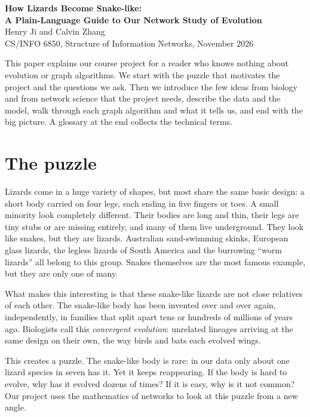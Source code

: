 \documentclass[11pt]{article}
\begin{document}
\begin{center}
{\Large\bfseries How Lizards Become Snake-like:\\[2pt] A Plain-Language Guide to Our Network Study of Evolution}\\[8pt]
Henry Ji and Calvin Zhang\\
CS/INFO 6850, Structure of Information Networks, November 2026
\end{center}

\vspace{6pt}
\noindent This paper explains our course project for a reader who knows nothing about evolution or graph algorithms. We start with the puzzle that motivates the project and the questions we ask. Then we introduce the few ideas from biology and from network science that the project needs, describe the data and the model, walk through each graph algorithm and what it tells us, and end with the big picture. A glossary at the end collects the technical terms.

\section{The puzzle}

Lizards come in a huge variety of shapes, but most share the same basic design: a short body carried on four legs, each ending in five fingers or toes. A small minority look completely different. Their bodies are long and thin, their legs are tiny stubs or are missing entirely, and many of them live underground. They look like snakes, but they are lizards. Australian sand-swimming skinks, European glass lizards, the legless lizards of South America and the burrowing ``worm lizards'' all belong to this group. Snakes themselves are the most famous example, but they are only one of many.

What makes this interesting is that these snake-like lizards are not close relatives of each other. The snake-like body has been invented over and over again, independently, in families that split apart tens or hundreds of millions of years ago. Biologists call this \emph{convergent evolution}: unrelated lineages arriving at the same design on their own, the way birds and bats each evolved wings.

This creates a puzzle. The snake-like body is rare: in our data only about one lizard species in seven has it. Yet it keeps reappearing. If the body is hard to evolve, why has it evolved dozens of times? If it is easy, why is it not common? Our project uses the mathematics of networks to look at this puzzle from a new angle.
\end{document}
